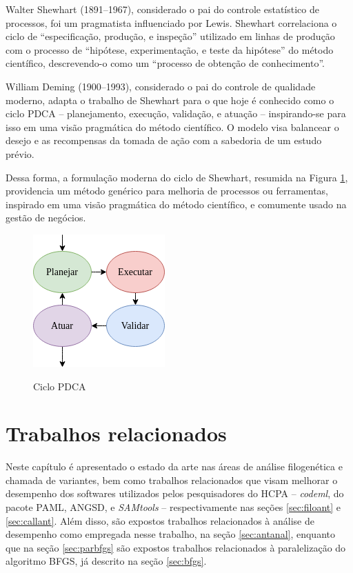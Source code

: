 \documentclass[cic,tc]{iiufrgs}
\begin{document}
Walter Shewhart (1891--1967), considerado o pai do controle estatístico de
processos, foi um pragmatista influenciado por Lewis. Shewhart correlaciona o
ciclo de ``especificação, produção, e inspeção'' utilizado em linhas de
produção com o processo de ``hipótese, experimentação, e teste da hipótese'' do
método científico, descrevendo-o como um ``processo de obtenção de
conhecimento''.

William Deming (1900--1993), considerado o pai do controle de qualidade
moderno, adapta o trabalho de Shewhart para o que hoje é conhecido como o ciclo
PDCA -- planejamento, execução, validação, e atuação -- inspirando-se para
isso em uma visão pragmática do método científico. O modelo visa balancear o
desejo e as recompensas da tomada de ação com a sabedoria de um estudo prévio.

Dessa forma, a formulação moderna do ciclo de Shewhart, resumida na Figura
\ref{fig:pdca_orig}, providencia um método genérico para melhoria de processos ou
ferramentas, inspirado em uma visão pragmática do método científico, e
comumente usado na gestão de negócios.

\begin{figure} \caption{Ciclo PDCA} \begin{center}
\includegraphics[width=0.25\linewidth]{img/pdca_orig.png} \end{center}
 \label{fig:pdca_orig} \end{figure}


%
%
%
%

\chapter{Trabalhos relacionados}
\label{chap:anteriores}

Neste capítulo é apresentado o estado da arte nas áreas de análise filogenética
e chamada de variantes, bem como trabalhos relacionados que visam melhorar o
desempenho dos softwares utilizados pelos pesquisadores do HCPA --
\textit{codeml}, do pacote PAML, ANGSD, e \textit{SAMtools} -- respectivamente nas seções
\ref{sec:filoant} e \ref{sec:callant}. Além disso, são expostos trabalhos
relacionados à análise de desempenho como empregada nesse trabalho, na seção
\ref{sec:antanal}, enquanto que na seção \ref{sec:parbfgs} são expostos
trabalhos relacionados à paralelização do algoritmo BFGS, já descrito na seção
\ref{sec:bfgs}.
\end{document}
